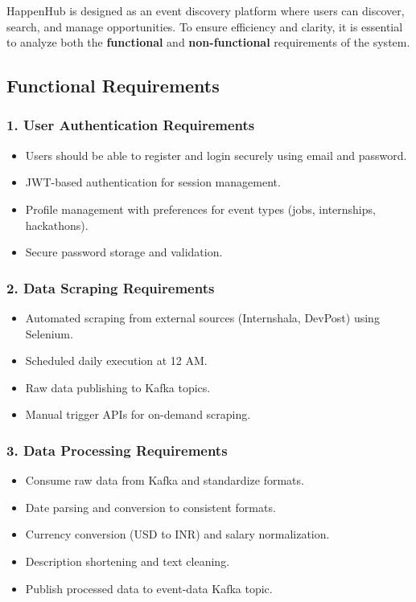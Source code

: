 \documentclass[12pt,a4paper]{report}
\begin{document}
HappenHub is designed as an event discovery platform where users can discover,
search, and manage opportunities. To ensure efficiency and clarity, it is
essential to analyze both the \textbf{functional} and \textbf{non-functional}
requirements of the system.

\subsection{Functional Requirements}

\subsubsection*{1. User Authentication Requirements}
\begin{itemize}
    \item Users should be able to register and login securely using email and password.
    \item JWT-based authentication for session management.
    \item Profile management with preferences for event types (jobs, internships,
          hackathons).
    \item Secure password storage and validation.
\end{itemize}

\subsubsection*{2. Data Scraping Requirements}
\begin{itemize}
    \item Automated scraping from external sources (Internshala, DevPost) using Selenium.
    \item Scheduled daily execution at 12 AM.
    \item Raw data publishing to Kafka topics.
    \item Manual trigger APIs for on-demand scraping.
\end{itemize}

\subsubsection*{3. Data Processing Requirements}
\begin{itemize}
    \item Consume raw data from Kafka and standardize formats.
    \item Date parsing and conversion to consistent formats.
    \item Currency conversion (USD to INR) and salary normalization.
    \item Description shortening and text cleaning.
    \item Publish processed data to event-data Kafka topic.
\end{itemize}
\end{document}

